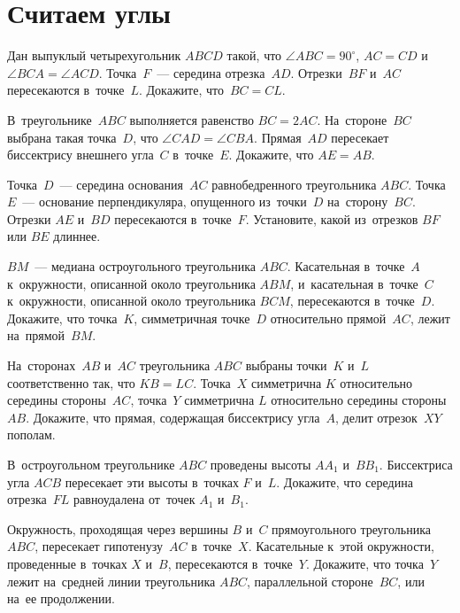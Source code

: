 
\section*{Считаем углы}


\begin{problems}

\item
Дан выпуклый четырехугольник $ABCD$ такой, что $\angle ABC = 90^{\circ}$,
$AC = CD$ и~$\angle BCA = \angle ACD$.
Точка~$F$~--- середина отрезка~$AD$.
Отрезки~$BF$ и~$AC$ пересекаются в~точке~$L$.
Докажите, что~$BC = CL$.

\item
В~треугольнике~$ABC$ выполняется равенство $BC = 2 AC$.
На~стороне~$BC$ выбрана такая точка~$D$, что $\angle CAD = \angle CBA$.
Прямая~$AD$ пересекает биссектрису внешнего угла~$C$ в~точке~$E$.
Докажите, что $AE = AB$.

\item
Точка~$D$~--- середина основания~$AC$ равнобедренного треугольника $ABC$.
Точка~$E$~--- основание перпендикуляра, опущенного из~точки~$D$
на~сторону~$BC$.
Отрезки $AE$ и~$BD$ пересекаются в~точке~$F$.
Установите, какой из~отрезков $BF$ или $BE$ длиннее.

\item
$BM$~--- медиана остроугольного треугольника $ABC$.
Касательная в~точке~$A$ к~окружности, описанной около треугольника $ABM$,
и~касательная в~точке~$C$ к~окружности, описанной около треугольника $BCM$,
пересекаются в~точке~$D$.
Докажите, что точка~$K$, симметричная точке~$D$ относительно прямой~$AC$, лежит
на~прямой~$BM$.

\item
На~сторонах~$AB$ и~$AC$ треугольника $ABC$ выбраны точки~$K$ и~$L$
соответственно так, что $KB = LC$.
Точка~$X$ симметрична $K$ относительно середины стороны~$AC$,
точка~$Y$ симметрична $L$ относительно середины стороны~$AB$.
Докажите, что прямая, содержащая биссектрису угла~$A$, делит отрезок~$XY$
пополам.

\item
В~остроугольном треугольнике $ABC$ проведены высоты $A A_1$ и~$B B_1$.
Биссектриса угла $ACB$ пересекает эти высоты в~точках $F$ и~$L$.
Докажите, что середина отрезка~$FL$ равноудалена от~точек $A_1$ и~$B_1$.

\item
Окружность, проходящая через вершины $B$ и~$C$ прямоугольного
треугольника $ABC$, пересекает гипотенузу~$AC$ в~точке~$X$.
Касательные к~этой окружности, проведенные в~точках $X$ и~$B$, пересекаются
в~точке~$Y$.
Докажите, что точка~$Y$ лежит на~средней линии треугольника $ABC$, параллельной
стороне~$BC$, или на~ее продолжении.

\end{problems}

